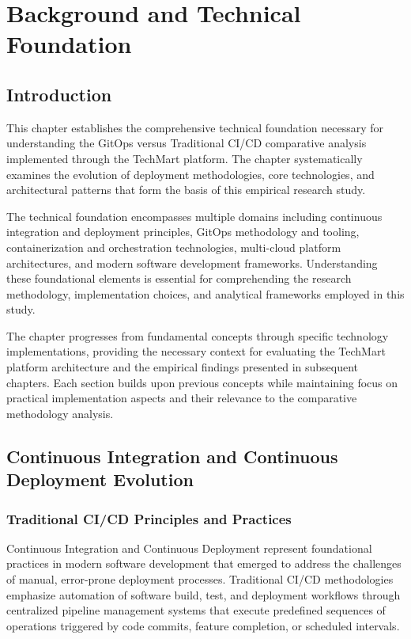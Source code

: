 \chapter{Background and Technical Foundation}

\section{Introduction}

This chapter establishes the comprehensive technical foundation necessary for understanding the GitOps versus Traditional CI/CD comparative analysis implemented through the TechMart platform. The chapter systematically examines the evolution of deployment methodologies, core technologies, and architectural patterns that form the basis of this empirical research study.

The technical foundation encompasses multiple domains including continuous integration and deployment principles, GitOps methodology and tooling, containerization and orchestration technologies, multi-cloud platform architectures, and modern software development frameworks. Understanding these foundational elements is essential for comprehending the research methodology, implementation choices, and analytical frameworks employed in this study.

The chapter progresses from fundamental concepts through specific technology implementations, providing the necessary context for evaluating the TechMart platform architecture and the empirical findings presented in subsequent chapters. Each section builds upon previous concepts while maintaining focus on practical implementation aspects and their relevance to the comparative methodology analysis.

\section{Continuous Integration and Continuous Deployment Evolution}

\subsection{Traditional CI/CD Principles and Practices}

Continuous Integration and Continuous Deployment represent foundational practices in modern software development that emerged to address the challenges of manual, error-prone deployment processes. Traditional CI/CD methodologies emphasize automation of software build, test, and deployment workflows through centralized pipeline management systems that execute predefined sequences of operations triggered by code commits, feature completion, or scheduled intervals.

